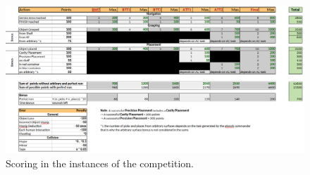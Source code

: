 

\begin{figure}[h!]
	\centering
	\includegraphics[width= 1\textheight, angle=90  ]{./images/tabels/robocup_penalty_points.png}
	\caption{Scoring in the instances of the \RCAW \YEAR competition.}
	\label{fig:test_scoring}
\end{figure}

